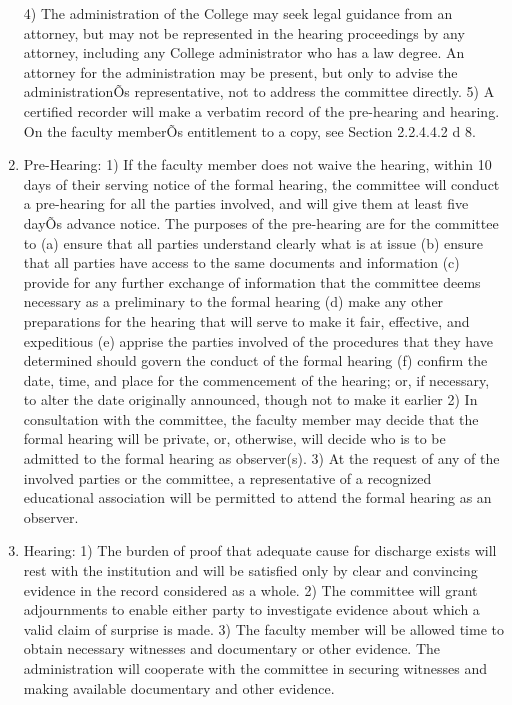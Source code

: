 \documentclass[letterpaper, 11pt]{article}
\begin{document}
\begin{enumerate}[label=\alph*)]
					4) The administration of the College may seek legal guidance from an attorney, but may not be represented in the hearing proceedings by any attorney, including any College administrator who has a law degree.  An attorney for the administration may be present, but only to advise the administrationÕs representative, not to address the committee directly.
					5) A certified recorder will make a verbatim record of the pre-hearing and hearing.
						{On the faculty memberÕs entitlement to a copy, see Section 2.2.4.4.2 d 8. }
					\item{Pre-Hearing:}
					1) If the faculty member does not waive the hearing, within 10 days of their serving notice of the formal hearing, the committee will conduct a pre-hearing for all the parties involved, and will give them at least five dayÕs advance notice.  The purposes of the pre-hearing are for the committee to
					(a) ensure that all parties understand clearly what is at issue
					(b) ensure that all parties have access to the same documents and information
					(c) provide for any further exchange of information that the committee deems necessary as a preliminary to the formal hearing
					(d) make any other preparations for the hearing that will serve to make it fair, effective, and expeditious
					(e) apprise the parties involved of the procedures that they have determined should govern the conduct of the formal hearing
					(f) confirm the date, time, and place for the commencement of the hearing; or, if necessary, to alter the date originally announced, though not to make it earlier
					2) In consultation with the committee, the faculty member may decide that the formal hearing will be private, or, otherwise, will decide who is to be admitted to the formal hearing as observer(s).
					3) At the request of any of the involved parties or the committee, a representative of a recognized educational association will be permitted to attend the formal hearing as an observer.
					\item{Hearing:}
					1) The burden of proof that adequate cause for discharge exists will rest with the institution and will be satisfied only by clear and convincing evidence in the record considered as a whole.
					2) The committee will grant adjournments to enable either party to investigate evidence about which a valid claim of surprise is made.
					3) The faculty member will be allowed time to obtain necessary witnesses and documentary or other evidence.  The administration will cooperate with the committee in securing witnesses and making available documentary and other evidence.

\end{enumerate}
\end{document}
